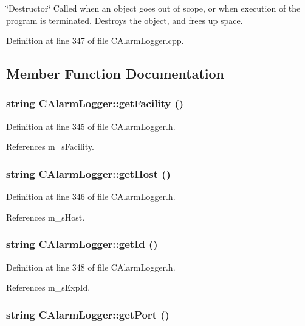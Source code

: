 \char`\"{}Destructor\char`\"{} Called when an object goes out of scope, or when execution of the program is terminated. Destroys the object, and frees up space. 

Definition at line 347 of file CAlarm\-Logger.cpp.

\subsection{Member Function Documentation}
\subsubsection{\setlength{\rightskip}{0pt plus 5cm}string CAlarm\-Logger::get\-Facility ()\hspace{0.3cm}{\tt  [inline]}}\label{classCAlarmLogger_a3}




Definition at line 345 of file CAlarm\-Logger.h.

References m\_\-s\-Facility.
\subsubsection{\setlength{\rightskip}{0pt plus 5cm}string CAlarm\-Logger::get\-Host ()\hspace{0.3cm}{\tt  [inline]}}\label{classCAlarmLogger_a4}




Definition at line 346 of file CAlarm\-Logger.h.

References m\_\-s\-Host.
\subsubsection{\setlength{\rightskip}{0pt plus 5cm}string CAlarm\-Logger::get\-Id ()\hspace{0.3cm}{\tt  [inline]}}\label{classCAlarmLogger_a6}




Definition at line 348 of file CAlarm\-Logger.h.

References m\_\-s\-Exp\-Id.
\subsubsection{\setlength{\rightskip}{0pt plus 5cm}string CAlarm\-Logger::get\-Port ()\hspace{0.3cm}{\tt  [inline]}}\label{classCAlarmLogger_a5}




